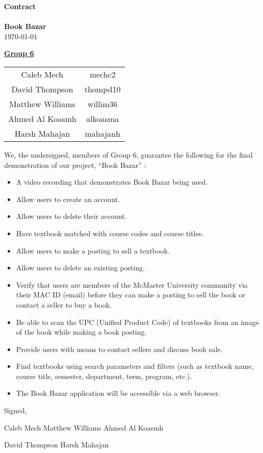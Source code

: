 \documentclass[fullpage]{article}
\newcommand{\bi}{\begin{itemize}}
\newcommand{\ei}{\end{itemize}}
\begin{document}
\vspace*{\fill}
\begin{center}

  {\Huge \textbf{Contract}}\\
\hrulefill\\[2mm]
  {\huge \textbf{Book Bazar}}\\[2mm]
{\large \today}\\[15mm]
{\large
\underline{\textbf{Group 6}}\\
\begin{tabular}{ c c }

 Caleb Mech & mechc2\\ 
 David Thompson & thompd10\\
 Matthew Williams & willim36\\
 Ahmed Al Koasmh & alkoasma\\
 Harsh Mahajan	& mahajanh    
\end{tabular}
}

\end{center}

\vspace*{\fill}

\newpage
We, the undersigned, members of Group 6, guarantee the following for the final demonstration of our project, ``Book Bazar'' :
\bi
\item A video recording that demonstrates Book Bazar being used.
\item Allow users to create an account.
\item Allow users to delete their account.
\item Have textbook matched with course codes and course titles.
\item Allow users to make a posting to sell a textbook.
\item Allow users to delete an existing posting.
\item Verify that users are members of the McMaster University community via their MAC ID (email) before they can make a posting to sell the book or contact a seller to buy a book.
\item Be able to scan the UPC (Unified Product Code) of textbooks from an image of the book while making a book posting.
\item Provide users with means to contact sellers and discuss book sale.
\item Find textbooks using search parameters and filters (such as textbook name, course title, semester, department, term, program, etc.).
\item The Book Bazar application will be accessible via a web browser.\\
\ei


Signed,\\


\vspace{1.5cm}

Caleb Mech \hspace{3.5cm} Matthew Williams \hspace{3.5cm} Ahmed Al Koasmh\\

 \vspace{1.75cm} 

David Thompson \hspace{2.8cm} Harsh Mahajan
\end{document}
